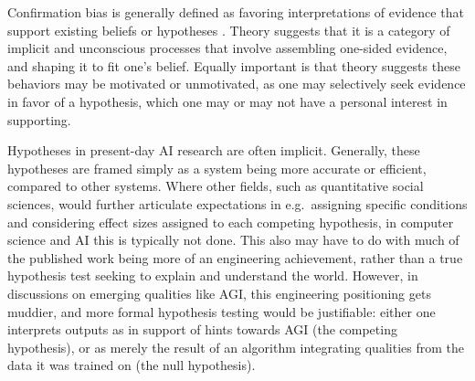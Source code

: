 \documentclass{article}
\theoremstyle{plain}
\theoremstyle{definition}
\theoremstyle{remark}
\begin{document}
Confirmation bias is generally defined as favoring interpretations of evidence that support existing beliefs or hypotheses \cite{nickerson1998confirmation}.
Theory suggests that it is a category of implicit and unconscious processes that involve assembling one-sided evidence, and shaping it to fit one's belief. Equally important is that theory suggests these behaviors may be motivated or unmotivated, as one may selectively seek
evidence in favor of a hypothesis, which one may or may not have a personal interest in supporting.

Hypotheses in present-day AI research are often implicit. Generally, these hypotheses are framed simply as a system being more accurate or efficient, compared to other systems. Where other fields, such as quantitative social sciences, would further articulate expectations in e.g.\ assigning specific conditions and considering effect sizes assigned to each competing hypothesis, in computer science and AI this is typically not done. This also may have to do with much of the published work being more of an engineering achievement, rather than a true hypothesis test seeking to explain and understand the world. %
However, in discussions on emerging qualities like AGI, this engineering positioning gets muddier, and more formal hypothesis testing would be justifiable: either one interprets outputs as in support of hints towards AGI (the competing hypothesis), or as merely the result of an algorithm integrating qualities from the data it was trained on (the null hypothesis). 
\end{document}
